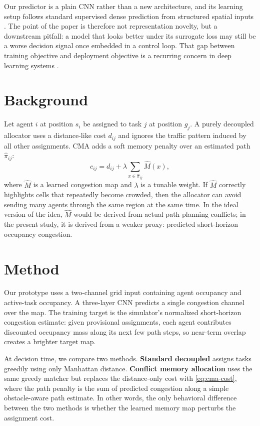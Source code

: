 Our predictor is a plain CNN rather than a new architecture, and its learning setup follows standard supervised dense prediction from structured spatial inputs \citep{goodfellow2016deep}. The point of the paper is therefore not representation novelty, but a downstream pitfall: a model that looks better under its surrogate loss may still be a worse decision signal once embedded in a control loop. That gap between training objective and deployment objective is a recurring concern in deep learning systems \citep{goodfellow2016deep}.

\section{Background}
\label{sec:background}

Let agent $i$ at position $s_i$ be assigned to task $j$ at position $g_j$. A purely decoupled allocator uses a distance-like cost $d_{ij}$ and ignores the traffic pattern induced by all other assignments. CMA adds a soft memory penalty over an estimated path $\hat{\pi}_{ij}$:
\begin{equation}
c_{ij} = d_{ij} + \lambda \sum_{x \in \hat{\pi}_{ij}} \hat{M}(x),
\label{eq:cma-cost}
\end{equation}
where $\hat{M}$ is a learned congestion map and $\lambda$ is a tunable weight. If $\hat{M}$ correctly highlights cells that repeatedly become crowded, then the allocator can avoid sending many agents through the same region at the same time. In the ideal version of the idea, $\hat{M}$ would be derived from actual path-planning conflicts; in the present study, it is derived from a weaker proxy: predicted short-horizon occupancy congestion.

\section{Method}
\label{sec:method}

Our prototype uses a two-channel grid input containing agent occupancy and active-task occupancy. A three-layer CNN predicts a single congestion channel over the map. The training target is the simulator's normalized short-horizon congestion estimate: given provisional assignments, each agent contributes discounted occupancy mass along its next few path steps, so near-term overlap creates a brighter target map.

At decision time, we compare two methods. \textbf{Standard decoupled} assigns tasks greedily using only Manhattan distance. \textbf{Conflict memory allocation} uses the same greedy matcher but replaces the distance-only cost with \cref{eq:cma-cost}, where the path penalty is the sum of predicted congestion along a simple obstacle-aware path estimate. In other words, the only behavioral difference between the two methods is whether the learned memory map perturbs the assignment cost.

